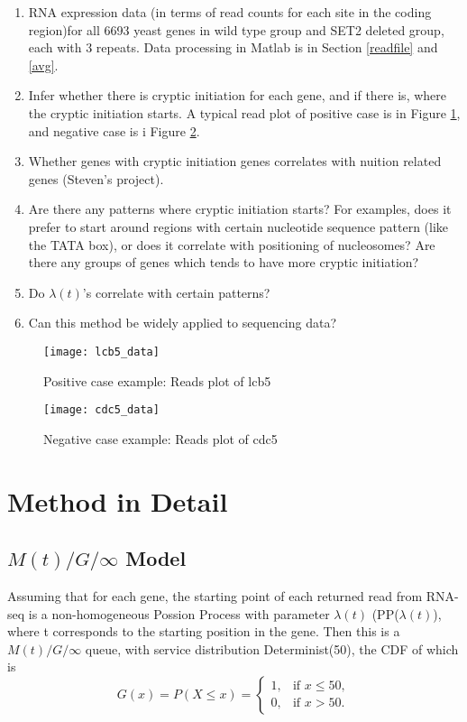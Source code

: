 \documentclass{article}
\begin{document}
\begin{enumerate}
	\item RNA expression data (in terms of read counts for each site in the coding region)for all 6693 yeast genes in wild type group and SET2 deleted group, each with 3 repeats. Data processing in Matlab is in Section \ref{readfile} and \ref{avg}.
	\item Infer whether there is cryptic initiation for each gene, and if there is, where the cryptic initiation starts. A typical read plot of positive case is in Figure \ref{lcb5data}, and negative case is i Figure \ref{cdc5data}.
	\item Whether genes with cryptic initiation genes correlates with nuition related genes (Steven's project).
	\item Are there any patterns where cryptic initiation starts? For examples, does it prefer to start around regions with certain nucleotide sequence pattern (like the TATA box), or does it correlate with positioning of nucleosomes? Are there any groups of genes which tends to have more cryptic initiation?  
	\item Do $\lambda(t)$'s correlate with certain patterns?
	\item Can this method be widely applied to sequencing data?
\end{enumerate}

\begin{figure}[h]
	\texttt{[image: lcb5\_data]}
	\caption{Positive case example: Reads plot of lcb5}
	\label{lcb5data}
\end{figure}

\begin{figure}[h]
	\texttt{[image: cdc5\_data]}
	\caption{Negative case example: Reads plot of cdc5}
	\label{cdc5data}
\end{figure}


\newpage
\section{Method in Detail}
\subsection{$M(t)/G/\infty$ Model}

Assuming that for each gene, the starting point of each returned read from RNA-seq is a non-homogeneous Possion Process with parameter $\lambda(t)$ (PP($\lambda(t)$), where t corresponds to the starting position in the gene. Then this is a $M(t)/G/\infty$ queue, with service distribution Determinist(50), the CDF of which is 
\[
G(x)= P(X \le x)=
\begin{cases}
1,& \text{if } x\le 50,\\
0,              & \text{if } x > 50.
\end{cases}
\]
\end{document}
